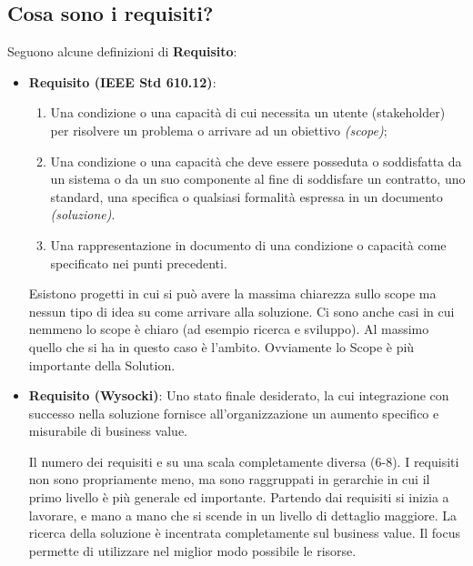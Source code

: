 \subsection{Cosa sono i requisiti?}
Seguono alcune definizioni di \textbf{Requisito}:
\begin{itemize}
	\item \textbf{Requisito (IEEE Std 610.12)}:
	\begin{enumerate}
		\item Una condizione o una capacità di cui necessita un utente (stakeholder) per risolvere un problema o arrivare ad un obiettivo \textit{(scope)};
		\item Una condizione o una capacità che deve essere posseduta o soddisfatta da un sistema o da un suo componente al fine di soddisfare un contratto, uno standard, una specifica o qualsiasi formalità espressa in un documento \textit{(soluzione)}.
		\item Una rappresentazione in documento di una condizione o capacità come specificato nei punti precedenti.
	\end{enumerate}
	\begin{warn}
		Esistono progetti in cui si può avere la massima chiarezza sullo scope ma nessun tipo di idea su come arrivare alla soluzione. Ci sono anche casi in cui nemmeno lo scope è chiaro (ad esempio ricerca e sviluppo). Al massimo quello che si ha in questo caso è l'ambito. Ovviamente lo Scope è più importante della Solution.
	\end{warn}
	\item \textbf{Requisito (Wysocki)}: Uno stato finale desiderato, la cui integrazione con successo nella soluzione fornisce all'organizzazione un aumento specifico e misurabile di business value.
	\begin{info}
		Il numero dei requisiti e su una scala completamente diversa (6-8). I requisiti non sono propriamente meno, ma sono raggruppati in gerarchie in cui il primo livello è più generale ed importante. Partendo dai requisiti si inizia a lavorare, e mano a mano che si scende in un livello di dettaglio maggiore. La ricerca della soluzione è incentrata completamente sul business value. Il focus permette di utilizzare nel miglior modo possibile le risorse.
	\end{info}
\end{itemize}

